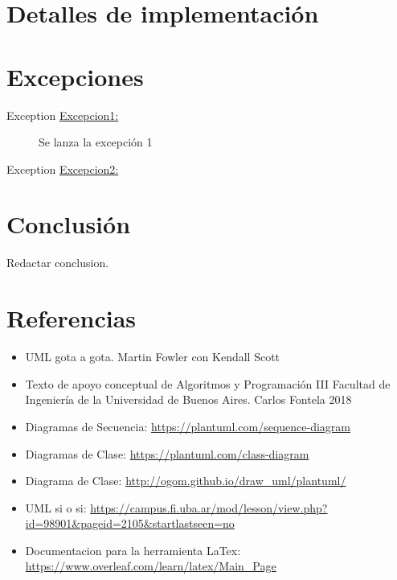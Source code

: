 \documentclass[titlepage,a4paper]{article}
\begin{document}
\section{Detalles de implementación}\label{sec:implementacion}



\section{Excepciones}\label{sec:excepciones}
\begin{description}
\item[Exception \underline{Excepcion1:}] Se lanza la excepción 1
\item[Exception \underline{Excepcion2:}] 
\end{description}


  \section{Conclusión}
  
 	Redactar conclusion.
\newpage
\section{Referencias}

\begin{itemize}
  \item UML gota a gota. Martin Fowler con Kendall Scott
  \item Texto de apoyo conceptual de Algoritmos y Programación III Facultad de Ingeniería de la Universidad de Buenos Aires. Carlos Fontela 2018
  \item Diagramas de Secuencia: \url{https://plantuml.com/sequence-diagram}
  \item Diagramas de Clase: \url{https://plantuml.com/class-diagram}
  \item Diagrama de Clase: \url{http://ogom.github.io/draw_uml/plantuml/}
  \item UML si o si: \url{https://campus.fi.uba.ar/mod/lesson/view.php?id=98901&pageid=2105&startlastseen=no}
  \item Documentacion para la herramienta LaTex: \url{https://www.overleaf.com/learn/latex/Main_Page}
\end{itemize}
\end{document}
